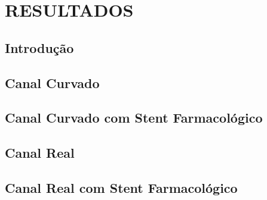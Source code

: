 \chapter{\textbf{RESULTADOS}}
\label{resultados}

\section{\textbf{Introdução}} 


\section{\textbf{Canal Curvado}} 
\label{canal curvado}



\section{\textbf{Canal Curvado com Stent Farmacológico}} 
\label{canal curvado com stent}



\section{\textbf{Canal Real}} 
\label{canal real}



\section{\textbf{Canal Real com Stent Farmacológico}} 
\label{canal real com stent}



